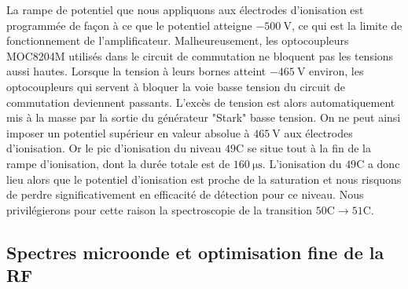 La rampe de potentiel que nous appliquons aux électrodes d'ionisation est programmée de façon à ce que le potentiel atteigne $\SI{-500}{\V}$, ce qui est la limite de fonctionnement de l'amplificateur.
Malheureusement, les optocoupleurs MOC8204M utilisés dans le circuit de commutation ne bloquent pas les tensions aussi hautes.
Lorsque la tension à leurs bornes atteint $\SI{-465}{\V}$ environ, les optocoupleurs qui servent à bloquer la voie basse tension du circuit de commutation deviennent passants.
L'excès de tension est alors automatiquement mis à la masse par la sortie du générateur "Stark" basse tension.
On ne peut ainsi imposer un potentiel supérieur en valeur absolue à $\SI{465}{\V}$ aux électrodes d'ionisation.
Or le pic d'ionisation du niveau $\mathrm{49C}$ se situe tout à la fin de la rampe d'ionisation, dont la durée totale est de $\SI{160}{\us}$.
L'ionisation du $\mathrm{49C}$ a donc lieu alors que le potentiel d'ionisation est proche de la saturation et nous risquons de perdre significativement en efficacité de détection pour ce niveau.
Nous privilégierons pour cette raison la spectroscopie de la transition $\mathrm{50C \rightarrow 51C}$.

	\subsection{Spectres microonde et optimisation fine de la RF}

